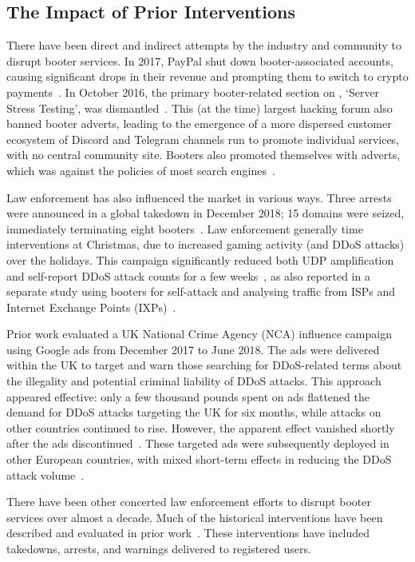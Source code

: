 \documentclass[letterpaper,twocolumn,10pt]{article}
\begin{document}
\subsection{The Impact of Prior Interventions} \label{subsec:prior-interventions}
There have been direct and indirect attempts by the industry and community to disrupt booter services. In 2017, PayPal shut down booter-associated accounts, causing significant drops in their revenue and prompting them to switch to crypto payments~\cite{brunt2017booted}. In October 2016, the primary booter-related section on \hackforums, `Server Stress Testing', was dismantled~\cite{booterbannedhackforum}. This (at the time) largest hacking forum also banned booter adverts, leading to the emergence of a more dispersed customer ecosystem of Discord and Telegram channels run to promote individual services, with no central community site. Booters also promoted themselves with adverts, which was against the policies of most search engines~\cite{claytongooglebooter}.

Law enforcement has also influenced the market in various ways. Three arrests were announced in a global takedown in December 2018; 15 domains were seized, immediately terminating eight booters~\cite{xmasevent2018}. Law enforcement generally time interventions at Christmas, due to increased gaming activity (and DDoS attacks) over the holidays. This campaign significantly reduced both UDP amplification and self-report DDoS attack counts for a few weeks~\cite{collier2019booting}, as also reported in a separate study using booters for self-attack and analysing traffic from ISPs and Internet Exchange Points (IXPs)~\cite{kopp2019ddos}.

Prior work evaluated a UK National Crime Agency (NCA) influence campaign using Google ads from December 2017 to June 2018. The ads were delivered within the UK to target and warn those searching for DDoS-related terms about the illegality and potential criminal liability of DDoS attacks. This approach appeared effective: only a few thousand pounds spent on ads flattened the demand for DDoS attacks targeting the UK for six months, while attacks on other countries continued to rise. However, the apparent effect vanished shortly after the ads discontinued~\cite{collier2019booting}. These targeted ads were subsequently deployed in other European countries, with mixed short-term effects in reducing the DDoS attack volume~\cite{moneva2023effect}. 

There have been other concerted law enforcement efforts to disrupt booter services over almost a decade. Much of the historical interventions have been described and evaluated in prior work~\cite{collier2019booting,bada2023evaluation}. These interventions have included takedowns, arrests, and warnings delivered to registered users.
\end{document}
